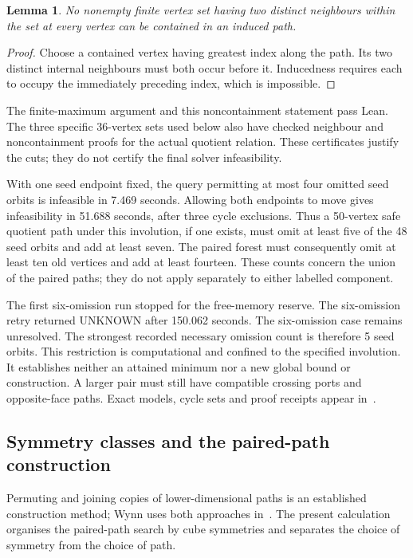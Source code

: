 \documentclass[11pt,a4paper]{article}
\newtheorem{lemma}[theorem]{Lemma}
\theoremstyle{definition}
\theoremstyle{remark}
\begin{document}
\begin{lemma}
No nonempty finite vertex set having two distinct neighbours within
the set at every vertex can be contained in an induced path.
\end{lemma}
\begin{proof}
Choose a contained vertex having greatest index along the path.
Its two distinct internal neighbours must both occur before it.
Inducedness requires each to occupy the immediately preceding index,
which is impossible.
\end{proof}
The finite-maximum argument and this noncontainment statement pass
Lean. The three specific 36-vertex sets used below also have checked
neighbour and noncontainment proofs for the actual quotient relation.
These certificates justify the cuts; they do not certify the final
solver infeasibility.

With one seed endpoint fixed, the query permitting at most four
omitted seed orbits is infeasible in 7.469 seconds. Allowing both
endpoints to move gives infeasibility in 51.688 seconds, after three
cycle exclusions. Thus a 50-vertex safe quotient path under this
involution, if one exists, must omit at least five of the 48 seed
orbits and add at least seven. The paired forest must consequently
omit at least ten old vertices and add at least fourteen. These
counts concern the union of the paired paths; they do not apply
separately to either labelled component.

The first six-omission run stopped for the free-memory reserve.
The six-omission retry returned UNKNOWN after 150.062 seconds. The six-omission case remains unresolved.
The strongest recorded necessary omission count is therefore 5
seed orbits. This restriction is computational and confined to the
specified involution. It establishes neither an attained minimum nor
a new global bound or construction. A larger pair must still have
compatible crossing ports and opposite-face paths. Exact models,
cycle sets and proof receipts appear in~\cite{cycles196archive}.


\subsection{Symmetry classes and the paired-path construction}
\label{sec:symmetry197}

Permuting and joining copies of lower-dimensional paths is an established
construction method; Wynn uses both approaches in~\cite{wynn2012}.
The present calculation organises the paired-path search by cube symmetries
and separates the choice of symmetry from the choice of path.
\end{document}
